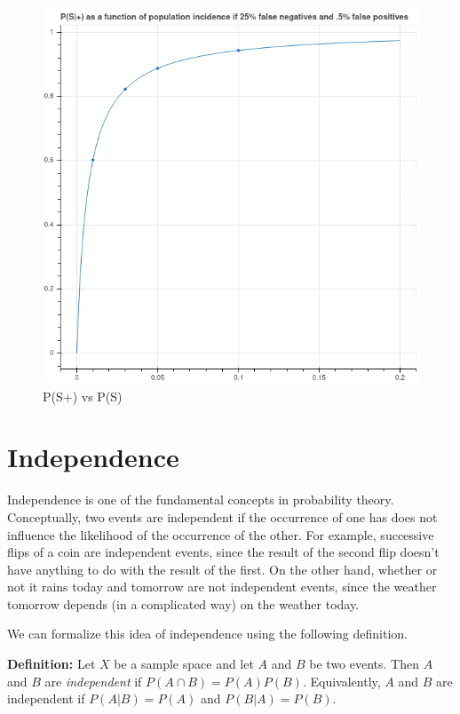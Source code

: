 \documentclass[
  oneside]{scrbook}
\begin{document}
\begin{figure}
\hypertarget{fig:covidfn}{%
\centering
\includegraphics{img/covidfn.png}
\caption{P(S\textbar+) vs P(S)}\label{fig:covidfn}
}
\end{figure}

\hypertarget{independence}{%
\section{Independence}\label{independence}}

Independence is one of the fundamental concepts in probability theory.
Conceptually, two events are independent if the occurrence of one has
does not influence the likelihood of the occurrence of the other. For
example, successive flips of a coin are independent events, since the
result of the second flip doesn't have anything to do with the result of
the first. On the other hand, whether or not it rains today and tomorrow
are not independent events, since the weather tomorrow depends (in a
complicated way) on the weather today.

We can formalize this idea of independence using the following
definition.

\textbf{Definition:} Let \(X\) be a sample space and let \(A\) and \(B\)
be two events. Then \(A\) and \(B\) are \emph{independent} if
\(P(A\cap B)=P(A)P(B)\). Equivalently, \(A\) and \(B\) are independent
if \(P(A|B)=P(A)\) and \(P(B|A)=P(B)\).
\end{document}
